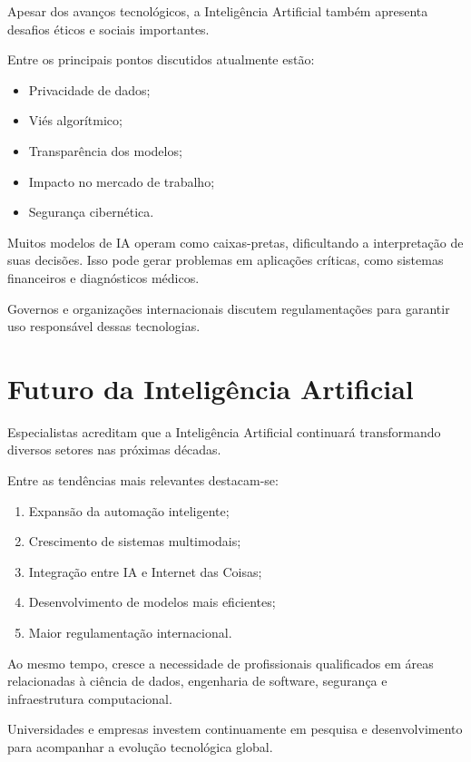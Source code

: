 \documentclass[11pt]{article}
\begin{document}
Apesar dos avanços tecnológicos, a Inteligência Artificial também apresenta desafios éticos e
sociais importantes.

Entre os principais pontos discutidos atualmente estão:

\begin{itemize}
    \item Privacidade de dados;
    \item Viés algorítmico;
    \item Transparência dos modelos;
    \item Impacto no mercado de trabalho;
    \item Segurança cibernética.
\end{itemize}

Muitos modelos de IA operam como caixas-pretas, dificultando a interpretação de suas decisões.
Isso pode gerar problemas em aplicações críticas, como sistemas financeiros e diagnósticos
médicos.

Governos e organizações internacionais discutem regulamentações para garantir uso
responsável dessas tecnologias. 

\section{Futuro da Inteligência Artificial}

Especialistas acreditam que a Inteligência Artificial continuará transformando diversos setores
nas próximas décadas.

Entre as tendências mais relevantes destacam-se:

\begin{enumerate}
    \item Expansão da automação inteligente;
    \item Crescimento de sistemas multimodais;
    \item Integração entre IA e Internet das Coisas;
    \item Desenvolvimento de modelos mais eficientes;
    \item Maior regulamentação internacional.
\end{enumerate}

Ao mesmo tempo, cresce a necessidade de profissionais qualificados em áreas relacionadas à
ciência de dados, engenharia de software, segurança e infraestrutura computacional.

Universidades e empresas investem continuamente em pesquisa e desenvolvimento para
acompanhar a evolução tecnológica global. 
\end{document}
